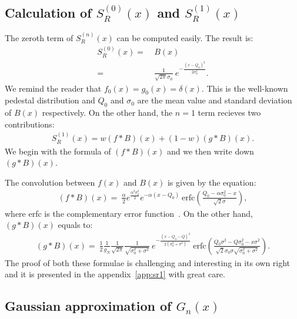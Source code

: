 \documentclass[a4paper,11pt]{article}
\begin{document}
\subsection{Calculation of $S^{(0)}_R(x)$ and $S^{(1)}_R(x)$}
%

The zeroth term of $S^{(n)}_R(x)$ can be computed easily. 
The result is:
\begin{align}
S^{(0)}_R(x)  = \ & B(x) \nonumber \\
                      = \ & \frac{1}{\sqrt{2\pi}\sigma_0} \ e^{-\frac{(x-Q_0)^2}{2\sigma_0^2}}.
\end{align}
We remind the reader that $f_0(x)=g_0(x)=\delta (x)$. 
This is the well-known pedestal distribution and $Q_0$ and $\sigma_0$ are the mean value and standard deviation of $B(x)$ respectively. 
On the other hand, the $n=1$ term recieves two contributions:
\begin{align}
S^{(1)}_R(x)  = w (f*B)(x) + (1-w)(g*B)(x). 
\end{align}                     
We begin with the formula of $(f*B)(x)$ and we then write down $(g*B)(x)$.

The convolution between $f(x)$ and $B(x)$ is given by the equation:
\begin{align}
(f*B)(x)  = \ \frac{\alpha}{2} e^{\frac{\alpha^2\sigma_0^2}{2}} e^{-\alpha (x-Q_0)} \ \text{erfc}\left( \frac{Q_0 - \alpha\sigma_0^2 - x }{\sqrt{2}\sigma} \right),
\end{align}  
where erfc is the complementary error function~\cite{erf}.
On the other hand, $(g*B)(x)$ equals to:
\begin{align}
(g*B)(x)  = \ \frac{1}{2} \frac{1}{g_N} \frac{1}{\sqrt{2\pi}} \frac{1}{\sqrt{\sigma_0^2 + \sigma^2}} \ e^{ -\frac{ (x-Q_0-Q)^2 }{2(\sigma_0^2 + \sigma^2)}} 
\ \text{erfc}\left(  \frac{ Q_0\sigma^2 -Q\sigma_0^2 -x \sigma^2  }{\sqrt{2} \sigma_0\sigma\sqrt{\sigma_0^2 + \sigma^2} }   \right).
\end{align}  
The proof of both these formulae is challenging and interesting in its own right and it is presented in the appendix~\ref{app:sr1} with great care. 

\subsection{Gaussian approximation of $G_n(x)$}
%
\end{document}
